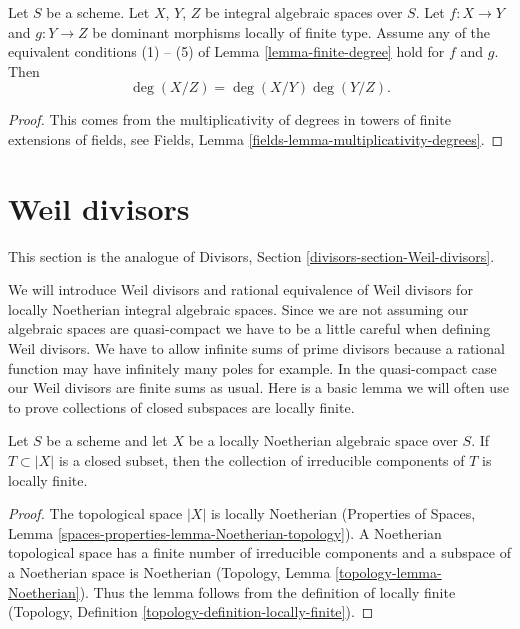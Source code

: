 \begin{lemma}
\label{lemma-degree-composition}
Let $S$ be a scheme.
Let $X$, $Y$, $Z$ be integral algebraic spaces over $S$.
Let $f : X \to Y$ and $g : Y \to Z$ be dominant morphisms locally
of finite type. Assume any of the equivalent conditions
(1) -- (5) of Lemma \ref{lemma-finite-degree} hold for $f$ and $g$. Then
$$
\deg(X/Z) = \deg(X/Y) \deg(Y/Z).
$$
\end{lemma}

\begin{proof}
This comes from the multiplicativity of degrees in towers
of finite extensions of fields, see
Fields, Lemma \ref{fields-lemma-multiplicativity-degrees}.
\end{proof}










\section{Weil divisors}
\label{section-Weil-divisors}

\noindent
This section is the analogue of Divisors, Section
\ref{divisors-section-Weil-divisors}.

\medskip\noindent
We will introduce Weil divisors and rational equivalence of Weil
divisors for locally Noetherian integral algebraic spaces.
Since we are not assuming our algebraic spaces are quasi-compact we have
to be a little careful when defining Weil divisors. We have to allow
infinite sums of prime divisors because a rational function may have
infinitely many poles for example. In the quasi-compact case our
Weil divisors are finite sums as usual. Here is a basic lemma we will
often use to prove collections of closed subspaces are locally finite.

\begin{lemma}
\label{lemma-components-locally-finite}
Let $S$ be a scheme and let $X$ be a locally Noetherian
algebraic space over $S$. If $T \subset |X|$ is a closed subset,
then the collection of irreducible components of $T$ is locally finite.
\end{lemma}

\begin{proof}
The topological space $|X|$ is locally Noetherian
(Properties of Spaces, Lemma \ref{spaces-properties-lemma-Noetherian-topology}).
A Noetherian topological space has a finite number of
irreducible components and a subspace of a Noetherian space is Noetherian
(Topology, Lemma \ref{topology-lemma-Noetherian}).
Thus the lemma follows from the definition of locally finite
(Topology, Definition \ref{topology-definition-locally-finite}).
\end{proof}

